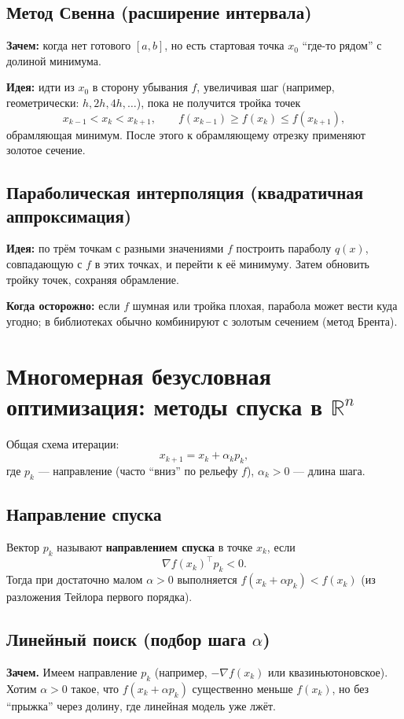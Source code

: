 \documentclass[12pt,a4paper]{article}
\newcommand{\R}{\mathbb{R}}
\newcommand{\grad}{\nabla}
\begin{document}
\subsection{Метод Свенна (расширение интервала)}
\textbf{Зачем:} когда нет готового \([a,b]\), но есть стартовая точка \(x_0\) ``где-то рядом'' с долиной минимума.

\textbf{Идея:} идти из \(x_0\) в сторону убывания \(f\), увеличивая шаг (например, геометрически: \(h,2h,4h,\ldots\)), пока не получится тройка точек
\[
  x_{k-1}<x_k<x_{k+1},\qquad f(x_{k-1})\ge f(x_k)\le f(x_{k+1}),
\]
обрамляющая минимум. После этого к обрамляющему отрезку применяют золотое сечение.

\subsection{Параболическая интерполяция (квадратичная аппроксимация)}
\textbf{Идея:} по трём точкам с разными значениями \(f\) построить параболу \(q(x)\), совпадающую с \(f\) в этих точках, и перейти к её минимуму. Затем обновить тройку точек, сохраняя обрамление.

\textbf{Когда осторожно:} если \(f\) шумная или тройка плохая, парабола может вести куда угодно; в библиотеках обычно комбинируют с золотым сечением (метод Брента).

\section{\texorpdfstring{Многомерная безусловная оптимизация: методы спуска в \(\R^n\)}{Многомерная безусловная оптимизация: методы спуска}}
Общая схема итерации:
\[
  x_{k+1}=x_k+\alpha_k p_k,
\]
где \(p_k\) --- направление (часто ``вниз'' по рельефу \(f\)), \(\alpha_k>0\) --- длина шага.

\subsection{Направление спуска}
Вектор \(p_k\) называют \textbf{направлением спуска} в точке \(x_k\), если
\[
  \grad f(x_k)^\top p_k<0.
\]
Тогда при достаточно малом \(\alpha>0\) выполняется \(f(x_k+\alpha p_k)<f(x_k)\) (из разложения Тейлора первого порядка).

\subsection{Линейный поиск (подбор шага \(\alpha\))}
\textbf{Зачем.} Имеем направление \(p_k\) (например, \(-\grad f(x_k)\) или квазиньютоновское). Хотим \(\alpha>0\) такое, что \(f(x_k+\alpha p_k)\) существенно меньше \(f(x_k)\), но без ``прыжка'' через долину, где линейная модель уже лжёт.
\end{document}
